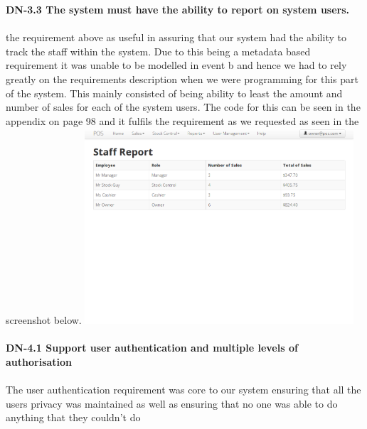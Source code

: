 \documentclass[a4paper]{article}
\begin{document}
\textbf{DN-3.3 The system must have the ability to report on system users.}
\\\\
the requirement above as useful in assuring that our system had the ability to track the staff within the system. Due to this being a metadata based requirement it was unable to be modelled in event b and hence we had to rely greatly on the requirements description when we were programming for this part of the system. This mainly consisted of being ability to least the amount and number of sales for each of the system users. The code for this can be seen in the appendix on page 98 and it fulfils the requirement as we requested as seen in the screenshot below. \includegraphics[width=10cm]{d5.png}
\\\\
\textbf{DN-4.1 Support user authentication and multiple levels of authorisation}
\\\\
The user authentication requirement was core to our system ensuring that all the users privacy was maintained as well as ensuring that no one was able to do anything that they couldn't do
\\\\
\end{document}
